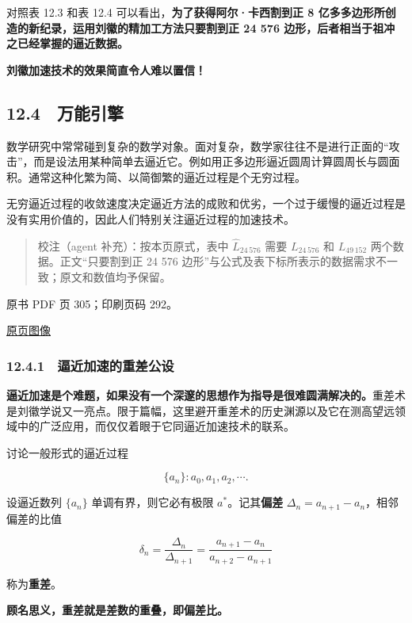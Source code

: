 对照表 12.3 和表 12.4 可以看出，\textbf{为了获得阿尔·卡西割到正 8 亿多多边形所创造的新纪录，运用刘徽的精加工方法只要割到正 24 576 边形，后者相当于祖冲之已经掌握的逼近数据。}

\textbf{刘徽加速技术的效果简直令人难以置信！}

\subsection{12.4　万能引擎}\label{ch12-ux4e07ux80fdux5f15ux64ce}

数学研究中常常碰到复杂的数学对象。面对复杂，数学家往往不是进行正面的``攻击''，而是设法用某种简单去逼近它。例如用正多边形逼近圆周计算圆周长与圆面积。通常这种化繁为简、以简御繁的逼近过程是个无穷过程。

无穷逼近过程的收敛速度决定逼近方法的成败和优劣，一个过于缓慢的逼近过程是没有实用价值的，因此人们特别关注逼近过程的加速技术。

\begin{quote}
校注（agent 补充）：按本页原式，表中 \(\widehat L_{24\,576}\) 需要 \(L_{24\,576}\) 和 \(L_{49\,152}\) 两个数据。正文``只要割到正 24 576 边形''与公式及表下标所表示的数据需求不一致；原文和数值均予保留。
\end{quote}

\clearpage

原书 PDF 页 305；印刷页码 292。

\href{source-images/pdf-305.jpeg}{原页图像}

\subsubsection{12.4.1　逼近加速的重差公设}\label{ch12-ux903cux8fd1ux52a0ux901fux7684ux91cdux5deeux516cux8bbe}

\textbf{逼近加速是个难题，如果没有一个深邃的思想作为指导是很难圆满解决的。}重差术是刘徽学说又一亮点。限于篇幅，这里避开重差术的历史渊源以及它在测高望远领域中的广泛应用，而仅仅着眼于它同逼近加速技术的联系。

讨论一般形式的逼近过程

\[
\{a_n\}:a_0,a_1,a_2,\cdots.
\]

设逼近数列 \(\{a_n\}\) 单调有界，则它必有极限 \(a^*\)。记其\textbf{偏差} \(\Delta_n=a_{n+1}-a_n\)，相邻偏差的比值

\[
\delta_n=\frac{\Delta_n}{\Delta_{n+1}}=\frac{a_{n+1}-a_n}{a_{n+2}-a_{n+1}}
\]

称为\textbf{重差}。

\textbf{顾名思义，重差就是差数的重叠，即偏差比。}

